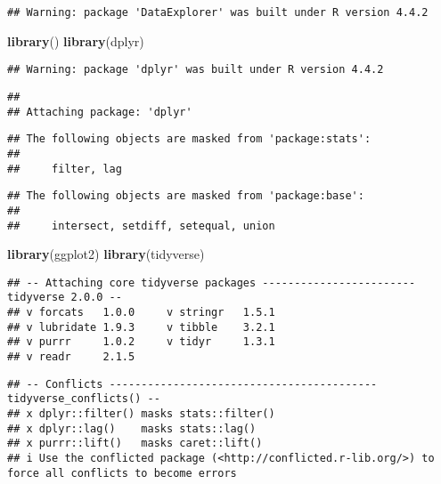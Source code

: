 \documentclass[
]{article}
\newenvironment{Shaded}{\begin{snugshade}}{\end{snugshade}}
\newcommand{\FunctionTok}[1]{\textcolor[rgb]{0.13,0.29,0.53}{\textbf{#1}}}
\newcommand{\NormalTok}[1]{#1}
\begin{document}
\begin{verbatim}
## Warning: package 'DataExplorer' was built under R version 4.4.2
\end{verbatim}

\begin{Shaded}
\begin{Highlighting}[]
\FunctionTok{library}\NormalTok{()}
\FunctionTok{library}\NormalTok{(dplyr)}
\end{Highlighting}
\end{Shaded}

\begin{verbatim}
## Warning: package 'dplyr' was built under R version 4.4.2
\end{verbatim}

\begin{verbatim}
## 
## Attaching package: 'dplyr'
\end{verbatim}

\begin{verbatim}
## The following objects are masked from 'package:stats':
## 
##     filter, lag
\end{verbatim}

\begin{verbatim}
## The following objects are masked from 'package:base':
## 
##     intersect, setdiff, setequal, union
\end{verbatim}

\begin{Shaded}
\begin{Highlighting}[]
\FunctionTok{library}\NormalTok{(ggplot2)}
\FunctionTok{library}\NormalTok{(tidyverse)}
\end{Highlighting}
\end{Shaded}

\begin{verbatim}
## -- Attaching core tidyverse packages ------------------------ tidyverse 2.0.0 --
## v forcats   1.0.0     v stringr   1.5.1
## v lubridate 1.9.3     v tibble    3.2.1
## v purrr     1.0.2     v tidyr     1.3.1
## v readr     2.1.5
\end{verbatim}

\begin{verbatim}
## -- Conflicts ------------------------------------------ tidyverse_conflicts() --
## x dplyr::filter() masks stats::filter()
## x dplyr::lag()    masks stats::lag()
## x purrr::lift()   masks caret::lift()
## i Use the conflicted package (<http://conflicted.r-lib.org/>) to force all conflicts to become errors
\end{verbatim}
\end{document}
